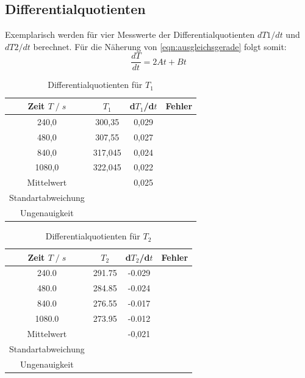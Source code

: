 \subsection{Differentialquotienten}
    Exemplarisch werden für vier Messwerte der Differentialquotienten $dT1/dt$ und
    $dT2/dt$ berechnet.
    Für die Näherung von \eqref{eqn:ausgleichsgerade} folgt somit:
    \begin{equation}
        \frac{dT}{dt}=2At+Bt
    \end{equation}
    
    \begin{table}
        \centering
        \begin{tabular}{c c c c}
            \toprule
            Zeit $T\;/\;s$ & $T_1$ & d$T_1$/d$t$ & Fehler\\
            \midrule
            240,0 & 300,35 & 0,029 & \\
            480,0 & 307,55 & 0,027 & \\
            840,0 & 317,045 & 0,024 & \\
            1080,0 & 322,045 & 0,022 & \\
            \midrule
            Mittelwert &&  0,025 & \\
            Standartabweichung &&   &\\
            Ungenauigkeit &&    &\\
            \bottomrule
        \end{tabular}
        \caption{Differentialquotienten für $T_1$}
        \label{fig:tab_T1t}
    \end{table}

    \begin{table}
        \centering
        \begin{tabular}{c c c c}
            \toprule
            Zeit $T\;/\;s$ & $T_2$ & d$T_2$/d$t$ & Fehler\\
            \midrule
            240.0 & 291.75 & -0.029 & \\
            480.0 & 284.85 & -0.024 & \\
            840.0 & 276.55 & -0.017 & \\
            1080.0 & 273.95 & -0.012 & \\
            \midrule
            Mittelwert &&  -0,021 & \\
            Standartabweichung &&   &\\
            Ungenauigkeit &&    &\\
            \bottomrule
        \end{tabular}
        \caption{Differentialquotienten für $T_2$}
        \label{fig:tab_T2t}
    \end{table}
    \newpage
